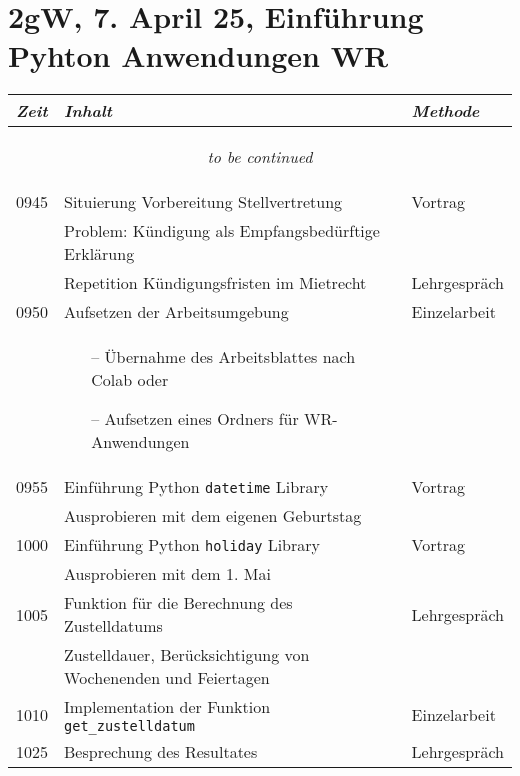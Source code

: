 \documentclass[a4paper]{scrreprt}
\begin{document}
\section*{2gW, 7. April 25, Einführung Pyhton Anwendungen WR}
\begin{longtable}{p{1.5cm}>{\RaggedRight}p{7.5cm}p{2.5cm}}
    \toprule
    \emph{Zeit}&\emph{Inhalt}&\emph{Methode}\\
    \midrule
    \endhead

    \midrule
    \multicolumn{3}{c}{\begin{tiny}\textit{to be continued}\end{tiny}}\\
    \midrule
    \endfoot

    \bottomrule
    \endlastfoot

    0945&Situierung Vorbereitung Stellvertretung&Vortrag\\ [3pt]
        &Problem: Kündigung als Empfangsbedürftige Erklärung&\\
        &Repetition Kündigungsfristen im Mietrecht&Lehrgespräch\\ [3pt]
    0950&Aufsetzen der Arbeitsumgebung&Einzelarbeit\\
        &\vspace{-7.5mm}
         \begin{itemize}
             \item[--] Übernahme des Arbeitsblattes nach Colab oder
             \item[--] Aufsetzen eines Ordners für WR-Anwendungen 
         \end{itemize}&\\ [3pt]

    0955&Einführung Python \texttt{datetime} Library&Vortrag\\
        &Ausprobieren mit dem eigenen Geburtstag&\\ [3pt]

    1000&Einführung Python \texttt{holiday} Library&Vortrag\\
        &Ausprobieren mit dem 1. Mai&\\

    1005&Funktion für die Berechnung des Zustelldatums&Lehrgespräch\\
        &Zustelldauer, Berücksichtigung von Wochenenden und
        Feiertagen&\\ [3pt]

    1010&Implementation der Funktion
    \texttt{get\_zustelldatum}&Einzelarbeit\\ [3pt]

    1025&Besprechung des Resultates&Lehrgespräch\\


\end{longtable}
\end{document}
